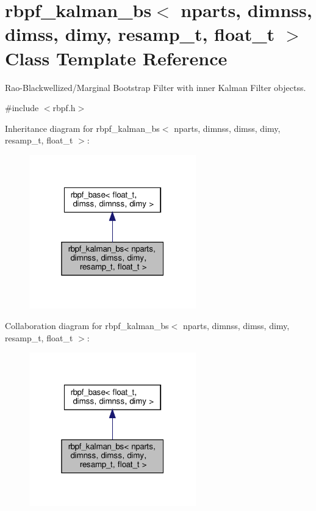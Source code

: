 \hypertarget{classrbpf__kalman__bs}{}\section{rbpf\+\_\+kalman\+\_\+bs$<$ nparts, dimnss, dimss, dimy, resamp\+\_\+t, float\+\_\+t $>$ Class Template Reference}
\label{classrbpf__kalman__bs}


Rao-\/\+Blackwellized/\+Marginal Bootstrap Filter with inner Kalman Filter objectss.  




{\ttfamily \#include $<$rbpf.\+h$>$}



Inheritance diagram for rbpf\+\_\+kalman\+\_\+bs$<$ nparts, dimnss, dimss, dimy, resamp\+\_\+t, float\+\_\+t $>$\+:\nopagebreak
\begin{figure}[H]
\begin{center}
\leavevmode
\includegraphics[width=205pt]{classrbpf__kalman__bs__inherit__graph}
\end{center}
\end{figure}


Collaboration diagram for rbpf\+\_\+kalman\+\_\+bs$<$ nparts, dimnss, dimss, dimy, resamp\+\_\+t, float\+\_\+t $>$\+:\nopagebreak
\begin{figure}[H]
\begin{center}
\leavevmode
\includegraphics[width=205pt]{classrbpf__kalman__bs__coll__graph}
\end{center}
\end{figure}
